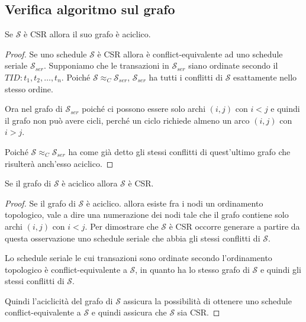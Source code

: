 \documentclass[oneside,a4paper,11pt]{book}
\theoremstyle{italicstyle}
\theoremstyle{normStyle}
\begin{document}
\subsection{Verifica algoritmo sul grafo}
\begin{tcolorbox}
  Se $\mathcal{S}$ è CSR allora il suo grafo è aciclico. 
\end{tcolorbox}
\begin{proof}
Se uno schedule $\mathcal{S}$ 
è CSR allora è conflict-equivalente ad uno schedule seriale $\mathcal{S}_{ser}$.
Supponiamo che le transazioni in $\mathcal{S}_{ser}$ siano ordinate secondo il $TID: t_1,t_2,\dots,t_n$. 
Poiché $\mathcal{S} \approx_C \mathcal{S}_{ser}$, $\mathcal{S}_{ser}$ ha tutti i conflitti 
di $\mathcal{S}$ esattamente nello stesso ordine.

Ora nel grafo di $\mathcal{S}_{ser}$ poiché ci possono essere solo archi $(i,j)$
con $i<j$ e quindi il grafo non può avere cicli, perché un ciclo richiede almeno un arco $(i,j)$
con $i>j$.

Poiché $\mathcal{S} \approx_C \mathcal{S}_{ser}$ ha come già detto gli stessi 
conflitti di quest'ultimo grafo che risulterà anch'esso aciclico.
\end{proof}
\begin{tcolorbox}
  Se il grafo di $\mathcal{S}$ è aciclico allora $\mathcal{S}$ è CSR.
\end{tcolorbox}
\begin{proof}
Se il grafo di $\mathcal{S}$ è aciclico. allora esiste fra i nodi un ordinamento 
topologico, vale a dire una numerazione dei nodi tale che il grafo contiene solo archi 
$(i,j)$ con $i<j$. Per dimostrare che $\mathcal{S}$ è CSR occorre generare a partire da questa osservazione 
uno schedule seriale che abbia gli stessi conflitti di $\mathcal{S}$.

Lo schedule seriale le cui transazioni sono ordinate secondo l'ordinamento topologico 
è conflict-equivalente a $\mathcal{S}$, in quanto ha lo stesso grafo di $\mathcal{S}$ e 
quindi gli stessi conflitti di $\mathcal{S}$.

Quindi l'aciclicità del grafo di $\mathcal{S}$ assicura la possibilità di ottenere 
uno schedule conflict-equivalente a $\mathcal{S}$ e quindi assicura che 
$\mathcal{S}$ sia CSR.
\end{proof}
\end{document}
